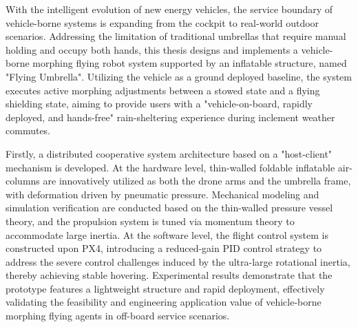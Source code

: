\begin{eabstract}
  With the intelligent evolution of new energy vehicles, the service boundary of vehicle-borne systems is expanding from the cockpit to real-world outdoor scenarios. Addressing the limitation of traditional umbrellas that require manual holding and occupy both hands, this thesis designs and implements a vehicle-borne morphing flying robot system supported by an inflatable structure, named "Flying Umbrella". Utilizing the vehicle as a ground deployed baseline, the system executes active morphing adjustments between a stowed state and a flying shielding state, aiming to provide users with a "vehicle-on-board, rapidly deployed, and hands-free" rain-sheltering experience during inclement weather commutes.

  Firstly, a distributed cooperative system architecture based on a "host-client" mechanism is developed. At the hardware level, thin-walled foldable inflatable air-columns are innovatively utilized as both the drone arms and the umbrella frame, with deformation driven by pneumatic pressure. Mechanical modeling and simulation verification are conducted based on the thin-walled pressure vessel theory, and the propulsion system is tuned via momentum theory to accommodate large inertia. At the software level, the flight control system is constructed upon PX4, introducing a reduced-gain PID control strategy to address the severe control challenges induced by the ultra-large rotational inertia, thereby achieving stable hovering. Experimental results demonstrate that the prototype features a lightweight structure and rapid deployment, effectively validating the feasibility and engineering application value of vehicle-borne morphing flying agents in off-board service scenarios.
\end{eabstract}

